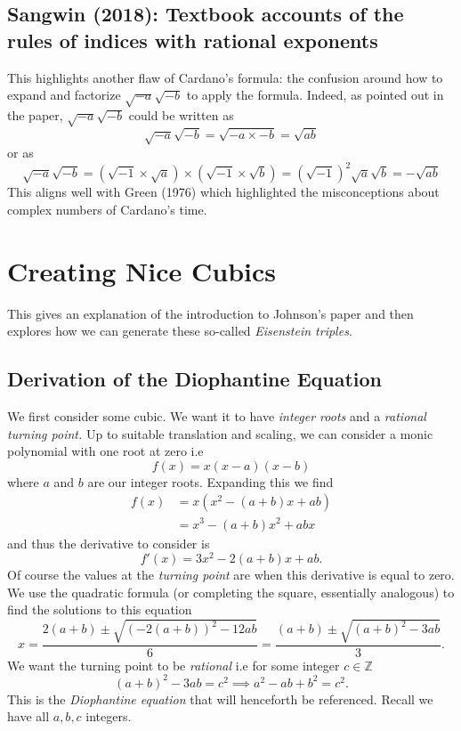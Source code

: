 \documentclass[12pt]{article}
\newcommand{\Z}{\mathbb{Z}}
\begin{document}
\subsection{Sangwin (2018): Textbook accounts of the rules of indices with rational exponents}
This highlights another flaw of Cardano's formula: the confusion around how to expand and factorize $\sqrt{-a} \sqrt{-b}$ to apply the formula. Indeed, as pointed out in the paper, $\sqrt{-a} \sqrt{-b}$ could be written as
\[\sqrt{-a} \sqrt{-b} = \sqrt{-a \times -b} = \sqrt{ab} \]
or as
\[\sqrt{-a} \sqrt{-b} = (\sqrt{-1} \times \sqrt{a}) \times (\sqrt{-1} \times \sqrt{b}) = (\sqrt{-1})^2 \sqrt{a} \sqrt{b} = -\sqrt{ab} \]
This aligns well with Green (1976) which highlighted the misconceptions about complex numbers of Cardano's time.

\section{Creating Nice Cubics}
This gives an explanation of the introduction to Johnson's paper and then explores how we can generate these so-called \textit{Eisenstein triples}.

\subsection{Derivation of the Diophantine Equation}
We first consider some cubic. We want it to have \textit{integer roots} and a \textit{rational turning point.} Up to suitable translation and scaling, we can consider a monic polynomial with one root at zero i.e
\begin{equation*}
    f(x) = x(x-a)(x-b)
\end{equation*}
where $a$ and $b$ are our integer roots. Expanding this we find
\begin{align*}
    f(x) &= x(x^2 - (a + b)x + ab)\\
    &= x^3 - (a+b)x^2 + abx
\end{align*}
and thus the derivative to consider is
\begin{equation*}
    f'(x) = 3x^2 - 2(a+b)x + ab.
\end{equation*}
Of course the values at the \textit{turning point} are when this derivative is equal to zero. We use the quadratic formula (or completing the square, essentially analogous) to find the solutions to this equation
\begin{equation*}
    x = \frac{2(a+b) \pm \sqrt{(-2(a+b))^2-12ab}}{6} = \frac{(a+b) \pm \sqrt{(a+b)^2 - 3ab}}{3}.
\end{equation*}
We want the turning point to be \textit{rational} i.e for some integer $c \in \Z$
\begin{equation}\label{eq:diophantine_eq1}
    (a+b)^2 - 3ab = c^2 \implies a^2 - ab + b^2 = c^2.
\end{equation}
This is the \textit{Diophantine equation} that will henceforth be referenced. Recall we have all $a, b, c$ integers.
\end{document}
